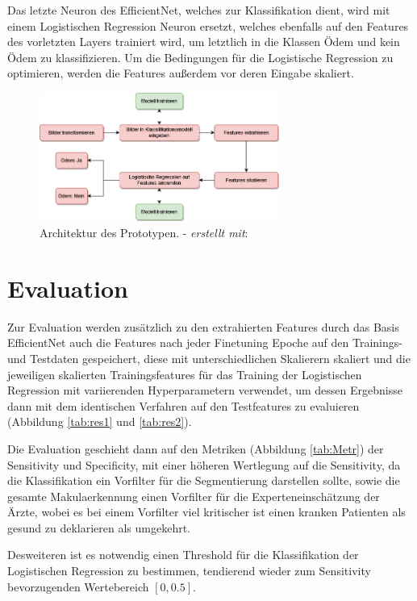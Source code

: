 Das letzte Neuron des EfficientNet, welches zur Klassifikation dient, wird mit einem Logistischen Regression Neuron ersetzt, welches ebenfalls auf den Features des vorletzten Layers trainiert wird, um letztlich in die Klassen Ödem und kein Ödem zu klassifizieren. Um die Bedingungen für die Logistische Regression zu optimieren, werden die Features außerdem vor deren Eingabe skaliert.

\begin{figure}[H]
\centering
\includegraphics[width=0.7\textwidth]{./pic/Klassifikation/flowchart.png}
\caption{Architektur des Prototypen. - \textit{erstellt mit}: \cite{23}}
\end{figure}

\section{Evaluation}

Zur Evaluation werden zusätzlich zu den extrahierten Features durch das Basis EfficientNet auch die Features nach jeder Finetuning Epoche auf den Trainings- und Testdaten gespeichert, diese mit unterschiedlichen Skalierern skaliert und die jeweiligen skalierten Trainingsfeatures für das Training der Logistischen Regression mit variierenden Hyperparametern verwendet, um dessen Ergebnisse dann mit dem identischen Verfahren auf den Testfeatures zu evaluieren (Abbildung \ref{tab:res1} und \ref{tab:res2}).

Die Evaluation geschieht dann auf den Metriken (Abbildung \ref{tab:Metr}) der Sensitivity und Specificity, mit einer höheren Wertlegung auf die Sensitivity, da die Klassifikation ein Vorfilter für die Segmentierung darstellen sollte, sowie die gesamte Makulaerkennung einen Vorfilter für die Experteneinschätzung der Ärzte, wobei es bei einem Vorfilter viel kritischer ist einen kranken Patienten als gesund zu deklarieren als umgekehrt.

Desweiteren ist es notwendig einen Threshold für die Klassifikation der Logistischen Regression zu bestimmen, tendierend wieder zum Sensitivity bevorzugenden Wertebereich $[0, 0.5]$.

